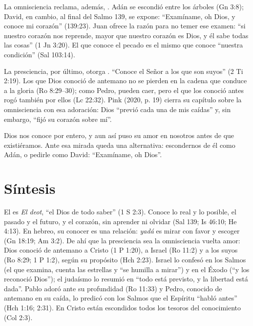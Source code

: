 La omnisciencia reclama, además, . Adán se escondió entre los árboles (Gn 3:8); David, en cambio, al final del Salmo 139, se expone: ``Examíname, oh Dios, y conoce mi corazón'' (139:23). Juan ofrece la razón para no temer ese examen: ``si nuestro corazón nos reprende, mayor que nuestro corazón es Dios, y él sabe todas las cosas'' (1 Jn 3:20). El que conoce el pecado es el mismo que conoce ``nuestra condición'' (Sal 103:14).

La presciencia, por último, otorga . ``Conoce el Señor a los que son suyos'' (2 Ti 2:19). Los que Dios conoció de antemano no se pierden en la cadena que conduce a la gloria (Ro 8:29--30); como Pedro, pueden caer, pero el que los conoció antes rogó también por ellos (Lc 22:32). Pink (2020, p. 19) cierra su capítulo sobre la omnisciencia con esa adoración: Dios ``previó cada una de mis caídas'' y, sin embargo, ``fijó su corazón sobre mí''.

\begin{tcolorbox}[colback=papiro,colframe=dorado,boxrule=1.4pt,arc=3pt]
\centering Dios nos conoce por entero, y aun así puso su amor en nosotros antes de que existiéramos. Ante esa mirada queda una alternativa: escondernos de él como Adán, o pedirle como David: ``Examíname, oh Dios''.
\end{tcolorbox}

\section{Síntesis}

\begin{tcolorbox}[colback=papiro,colframe=azul,boxrule=1pt,arc=3pt]
El \SENOR{} es \emph{El deot}, ``el Dios de todo saber'' (1 S 2:3). Conoce lo real y lo posible, el pasado y el futuro, y el corazón, sin aprender ni olvidar (Sal 139; Is 46:10; He 4:13). En hebreo, su conocer es una relación: \emph{yadá} es mirar con favor y escoger (Gn 18:19; Am 3:2). De ahí que la presciencia sea la omnisciencia vuelta amor: Dios conoció de antemano a Cristo (1 P 1:20), a Israel (Ro 11:2) y a los suyos (Ro 8:29; 1 P 1:2), según su propósito (Hch 2:23). Israel lo confesó en los Salmos (el que examina, cuenta las estrellas y ``se humilla a mirar'') y en el Éxodo (``y los reconoció Dios''); el judaísmo lo resumió en ``todo está previsto, y la libertad está dada''. Pablo adoró ante su profundidad (Ro 11:33) y Pedro, conocido de antemano en su caída, lo predicó con los Salmos que el Espíritu ``habló antes'' (Hch 1:16; 2:31). En Cristo están escondidos todos los tesoros del conocimiento (Col 2:3).
\end{tcolorbox}

